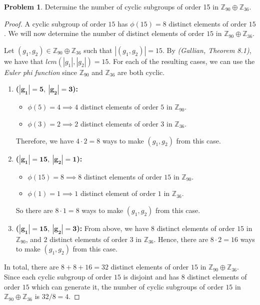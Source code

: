 \documentclass[12pt,reqno]{article}
\newcommand{\Z}{\mathbb{Z}}
\theoremstyle{plain}
\theoremstyle{definition}
\newtheorem{problem}{Problem}
\begin{document}
\begin{problem} 
    Determine the number of cyclic subgroups of order 15 in $\mathbb{Z}_{90} \oplus \mathbb{Z}_{36}$.
\end{problem}

\begin{proof}
    A cyclic subgroup of order \(15\) has \(\phi(15)=8\) distinct elements of order \(15\).
    We will now determine the number of distinct elements of order \(15\) in \(\Z_{90}\oplus\Z_{36}\).
    
    Let \((g_1,g_2)\in\Z_{90}\oplus\Z_{36}\) such that \(|(g_1,g_2)|=15\).
    By \emph{(Gallian, Theorem 8.1)}, we have that \(lcm(|g_1|,|g_2|)=15\).
    For each of the resulting cases, we can use the \emph{Euler phi function} since \(\Z_{90}\) and
    \(\Z_{36}\) are both cyclic.
    \begin{enumerate}
        \item \textbf{(\(\mathbf{|g_1|=5,\ |g_2|=3}\)):} 
            \begin{itemize}
                \item \(\phi(5)=4\implies 4\) distinct elements of order
                \(5\) in \(\Z_{90}\).
                \item \(\phi(3)=2\implies 2\) distinct elements of order \(3\) in \(\Z_{36}\).
            \end{itemize}
            Therefore, we have \(4\cdot 2=8\) ways to make \((g_1,g_2)\) from this case.
        
        \item \textbf{(\(\mathbf{|g_1|=15,\ |g_2|=1}\)):} 
            \begin{itemize}
                \item \(\phi(15)=8\implies 8\) distinct elements of order
                \(15\) in \(\Z_{90}\).
                \item \(\phi(1)=1\implies 1\) distinct element of order \(1\) in \(\Z_{36}\).
            \end{itemize}
            So there are \(8\cdot 1=8\) ways to make \((g_1,g_2)\) from this case.
        
        \item \textbf{(\(\mathbf{|g_1|=15,\ |g_2|=3}\)):} 
            From above, we have \(8\) distinct elements of order
            \(15\) in \(\Z_{90}\), and \(2\) distinct elements of order \(3\) in \(\Z_{36}\).
            Hence, there are \(8\cdot 2=16\) ways to make \((g_1,g_2)\) from this case.
    \end{enumerate}
    In total, there are \(8+8+16=32\) distinct elements of order \(15\) in \(\Z_{90}\oplus\Z_{36}\). Since
    each cyclic subgroup of order \(15\) is disjoint and has \(8\) distinct elements of order \(15\)
    which can generate it, the number of cyclic subgroups of order \(15\) in \(\Z_{90}\oplus\Z_{36}\) is \(32/8=4\).
\end{proof}
\end{document}
